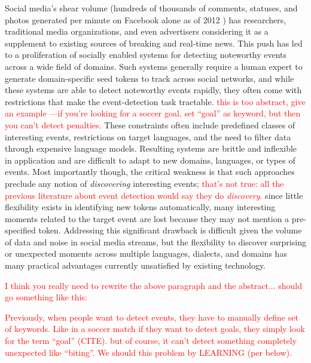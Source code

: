 \documentclass{sig-alternate}
\newcommand{\red}[1]{\textcolor{red}{#1}}
\begin{document}
Social media's shear volume (hundreds of thousands of comments, statuses, and photos generated per minute on Facebook alone as of 2012 \cite{Pring2012}) has researchers, traditional media organizations, and even advertisers considering it as a supplement to existing sources of breaking and real-time news.
This push has led to a proliferation of socially enabled systems for detecting noteworthy events across a wide field of domains.
Such systems generally require a human expert to generate domain-specific seed tokens to track across social networks, and while these systems are able to detect noteworthy events rapidly, they often come with restrictions that make the event-detection task tractable. \red{this is too abstract, give an example ---if you're looking for a soccer goal, set ``goal'' as keyword, but then you can't detect penalties.}
These constraints often include predefined classes of interesting events, restrictions on target languages, and the need to filter data through expensive language models.
Resulting systems are brittle and inflexible in application and are difficult to adapt to new domains, languages, or types of events.
Most importantly though, the critical weakness is that such approaches preclude any notion of \emph{discovering} interesting events; \red{that's not true: all the previous literature about event detection would say they do {\it discovery}.} since little flexibility exists in identifying new tokens automatically, many interesting moments related to the target event are lost because they may not mention a pre-specified token.
Addressing this significant drawback is difficult given the volume of data and noise in social media streams, but the flexibility to discover surprising or unexpected moments across multiple languages, dialects, and domains has many practical advantages currently unsatisfied by existing technology.

\red{I think you really need to rewrite the above paragraph and the abstract... should go something like this:}

\red{Previously, when people want to detect events, they have to
  manually define set of keywords. Like in a soccer match if they want
  to detect goals, they simply look for the term ``goal'' (CITE). but
  of course, it can't detect something completely unexpected like
  ``biting''. We should this problem by LEARNING (per below).}
\end{document}

